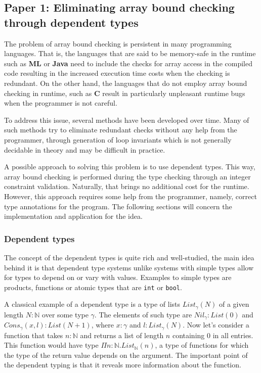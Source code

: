 \documentclass[a4paper,UKenglish]{lipics-v2016}
\begin{document}
\subsection{Paper 1: Eliminating array bound checking through dependent types}

The problem of array bound checking is persistent in many programming
languages. That is, the languages that are said to be memory-safe in the
runtime such as \textbf{ML} or \textbf{Java} need to include the checks for
array access in the compiled code resulting in the increased execution time
costs when the checking is redundant. On the other hand, the languages that do
not employ array bound checking in runtime, such as \textbf{C} result in
particularly unpleasant runtime bugs when the programmer is not careful.

To address this issue, several methods have been developed over time. Many of
such methods try to eliminate redundant checks without any help from the
programmer, through generation of loop invariants which is not generally
decidable in theory and may be difficult in practice.

A possible approach to solving this problem is to use dependent types. This
way, array bound checking is performed during the type checking through an
integer constraint validation. Naturally, that brings no additional cost for
the runtime.  However, this approach requires some help from the programmer,
namely, correct type annotations for the program. The following sections will
concern the implementation and application for the idea.

\subsubsection{Dependent types}

The concept of the dependent types is quite rich and well-studied, the main
idea behind it is that dependent type systems unlike systems with simple types
allow for types to depend on or vary with values. Examples to simple types are
products, functions or atomic types that are \texttt{int} or \texttt{bool}.

A classical example of a dependent type is a type of lists $List_\gamma(N)$ of
a given length $N : \mathbb{N}$ over some type $\gamma$. The elements of such
type are $Nil_\gamma : List(0)$ and $Cons_\gamma(x, l) : List(N+1)$, where $x :
\gamma$ and $l : List_\gamma(N)$. Now let's consider a function that takes $n :
\mathbb{N}$ and returns a list of length $n$ containing $0$ in all entries.
This function would have type $\Pi n : \mathbb{N}.List_\mathbb{N}(n)$, a type
of functions for which the type of the return value depends on the argument.
The important point of the dependent typing is that it reveals more information
about the function.
\end{document}
